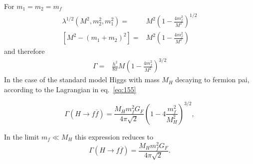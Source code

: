 For $m_1=m_2=m_f$
\begin{align}
  \lambda^{1/2}(M^2,m_2^2,m_1^2)=&M^2\left(1-\frac{4m_f^2}{M^2}\right)^{1/2}\nonumber\\
\left[M^2-(m_1+m_2)^2\right]=&M^2\left(1-\frac{4m_f^2}{M^2}\right)
\end{align}
and therefore
\begin{align}
\Gamma=&\frac{h^2}{8 \pi}M\left(1-\frac{4m_f^2}{M^2}\right)^{3/2}
\end{align}
In the case of the standard model Higgs with mass $M_H$ decaying to fermion pai, according to the Lagrangian in eq.~\eqref{eq:155}

\begin{equation}
\Gamma(H\to f\overline{f})=\frac{M_{H}m_{f}^{2}G_{F}}{4\pi\sqrt{2}}
\left(1-4\frac{m^2_{f}}{M^2_{H}}\right)^{3/2}, 
\end{equation}

In the limit $m_{f}\ll M_{H}$ this expression reduces to 
\begin{equation}
\Gamma(H\to
f\overline{f})=\frac{M_{H}m_{f}^{2}G_{F}}{4\pi\sqrt{2}}. 
\end{equation}




